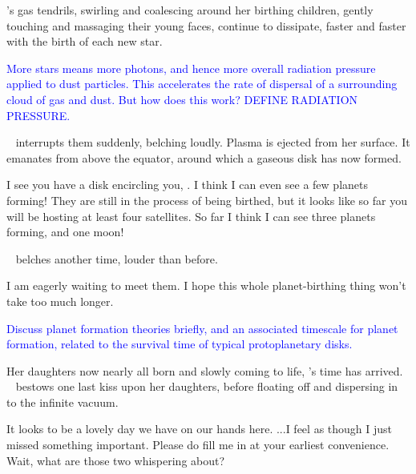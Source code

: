 \documentclass[main.tex]{subfiles}
\begin{document}
\par \nar \rmpleione's gas tendrils, swirling and coalescing around her birthing children, gently touching and massaging their young faces, continue to dissipate, faster and faster with the birth of each new star.

\begin{tcolorbox}[sharp corners, colback=blue!30, colframe=blue!80!blue, title=Radiation Pressure]
\par \textcolor{blue} {More stars means more photons, and hence more overall radiation pressure applied to dust particles.  This accelerates the rate of dispersal of a surrounding cloud of gas and dust.  But how does this work?  DEFINE RADIATION PRESSURE.}
\end{tcolorbox}

\par \nar \rmelectra~ interrupts them suddenly, belching loudly.  Plasma is ejected from her surface.  It emanates from above the equator, around which a gaseous disk has now formed.  

\par \Maia I see you have a disk encircling you, \rmelectra.  I think I can even see a few planets forming!  They are still in the process of being birthed, but it looks like so far you will be hosting at least four satellites.  So far I think I can see three planets forming, and one moon!

\par \nar \rmelectra~ belches another time, louder than before.

\par \Electra I am eagerly waiting to meet them.  I hope this whole planet-birthing thing won't take too much longer.

\begin{tcolorbox}[sharp corners, colback=blue!30, colframe=blue!80!blue, title=How Long do Planets Take to Form?]
\par \textcolor{blue} {Discuss planet formation theories briefly, and an associated timescale for planet formation, related to the survival time of typical protoplanetary disks.}
\end{tcolorbox}

\par \nar Her daughters now nearly all born and slowly coming to life, \rmpleione's time has arrived. \rmpleione~ bestows one last kiss upon her daughters, before floating off and dispersing in to the infinite vacuum.

\par \Electra It looks to be a lovely day we have on our hands here. ...I feel as though I just missed something important.  Please do fill me in at your earliest convenience.  Wait, what are those two whispering about?
\end{document}
